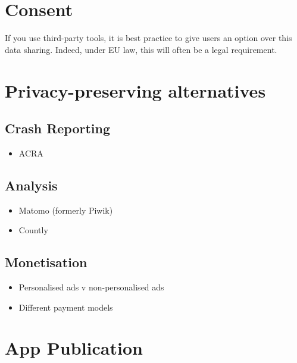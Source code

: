 \documentclass[
]{book}
\providecommand{\tightlist}{%
  \setlength{\itemsep}{0pt}\setlength{\parskip}{0pt}}
\begin{document}
\hypertarget{consent}{%
\section{Consent}\label{consent}}

If you use third-party tools, it is best practice to give users an option over this data sharing. Indeed, under EU law, this will often be a legal requirement.

\hypertarget{privacy-preserving-alternatives}{%
\section{Privacy-preserving alternatives}\label{privacy-preserving-alternatives}}

\hypertarget{crash-reporting}{%
\subsection{Crash Reporting}\label{crash-reporting}}

\begin{itemize}
\tightlist
\item
  ACRA
\end{itemize}

\hypertarget{analysis}{%
\subsection{Analysis}\label{analysis}}

\begin{itemize}
\tightlist
\item
  Matomo (formerly Piwik)
\item
  Countly
\end{itemize}

\hypertarget{monetisation}{%
\subsection{Monetisation}\label{monetisation}}

\begin{itemize}
\tightlist
\item
  Personalised ads v non-personalised ads
\item
  Different payment models
\end{itemize}

\hypertarget{app-publication}{%
\section{App Publication}\label{app-publication}}
\end{document}
